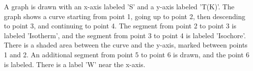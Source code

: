 A graph is drawn with an x-axis labeled 'S' and a y-axis labeled 'T(K)'. The graph shows a curve starting from point 1, going up to point 2, then descending to point 3, and continuing to point 4. The segment from point 2 to point 3 is labeled 'Isotherm', and the segment from point 3 to point 4 is labeled 'Isochore'. There is a shaded area between the curve and the y-axis, marked between points 1 and 2. An additional segment from point 5 to point 6 is drawn, and the point 6 is labeled. There is a label 'W' near the x-axis.